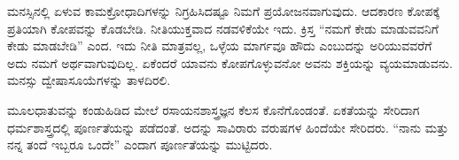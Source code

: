 ಮನಸ್ಸಿನಲ್ಲಿ ಏಳುವ ಕಾಮಕ್ರೋಧಾದಿಗಳನ್ನು ನಿಗ್ರಹಿಸಿದಷ್ಟೂ ನಿಮಗೆ ಪ್ರಯೋಜನವಾಗುವುದು. ಆದಕಾರಣ ಕೋಪಕ್ಕೆ ಪ್ರತಿಯಾಗಿ ಕೋಪವನ್ನು ಕೊಡಬೇಡಿ. ನೀತಿಯುಕ್ತವಾದ ನಡವಳಿಕೆಯೇ ಇದು. ಕ್ರಿಸ್ತ “ನಮಗೆ ಕೇಡು ಮಾಡುವವನಿಗೆ ಕೇಡು ಮಾಡಬೇಡಿ” ಎಂದ. ಇದು ನೀತಿ ಮಾತ್ರವಲ್ಲ, ಒಳ್ಳೆಯ ಮಾರ್ಗವೂ ಹೌದು ಎಂಬುದನ್ನು ಅರಿಯುವವರೆಗೆ ಅದು ನಮಗೆ ಅರ್ಥವಾಗುವುದಿಲ್ಲ. ಏಕೆಂದರೆ ಯಾವನು ಕೋಪಗೊಳ್ಳುವನೋ ಅವನು ಶಕ್ತಿಯನ್ನು ವ್ಯಯಮಾಡುವನು. ಮನಸ್ಸು ದ್ವೇಷಾಸೂಯೆಗಳನ್ನು ತಾಳದಿರಲಿ.

ಮೂಲಧಾತುವನ್ನು ಕಂಡುಹಿಡಿದ ಮೇಲೆ ರಸಾಯನಶಾಸ್ತ್ರಜ್ಞನ ಕೆಲಸ ಕೊನೆ\break ಗೊಂಡಂತೆ. ಏಕತೆಯನ್ನು ಸೇರಿದಾಗ ಧರ್ಮಶಾಸ್ತ್ರದಲ್ಲಿ ಪೂರ್ಣತೆಯನ್ನು ಪಡೆದಂತೆ. ಅದನ್ನು ಸಾವಿರಾರು ವರುಷಗಳ ಹಿಂದೆಯೇ ಸೇರಿದರು. “ನಾನು ಮತ್ತು ನನ್ನ ತಂದೆ ಇಬ್ಬರೂ ಒಂದೇ” ಎಂದಾಗ ಪೂರ್ಣತೆಯನ್ನು ಮುಟ್ಟಿದರು.

